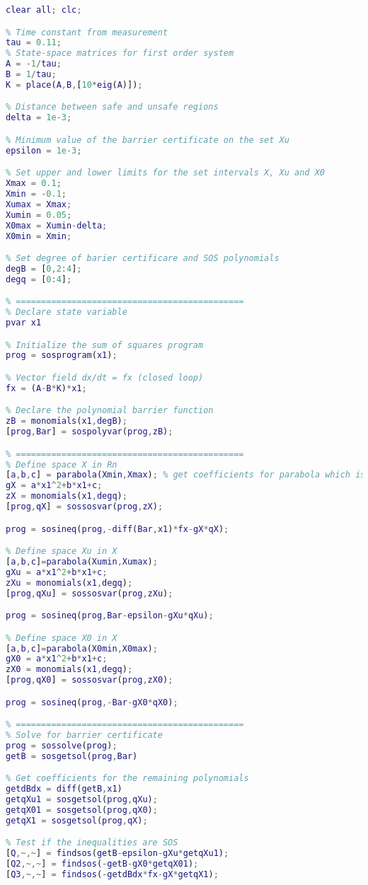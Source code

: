 \begin{lstlisting}[language=matlab]
% 1D system WITHOUT REFERENCE
clear all; clc; 

% Time constant from measurement
tau = 0.11;
% State-space matrices for first order system
A = -1/tau;
B = 1/tau;
K = place(A,B,[10*eig(A)]);

% Distance between safe and unsafe regions
delta = 1e-3;

% Minimum value of the barrier certificate on the set Xu
epsilon = 1e-3;

% Set upper and lower limits for the set intervals X, Xu and X0
Xmax = 0.1;
Xmin = -0.1;
Xumax = Xmax;
Xumin = 0.05;
X0max = Xumin-delta;
X0min = Xmin;

% Set degree of barier certificare and SOS polynomials
degB = [0,2:4];
degq = [0:4];

% =============================================
% Declare state variable
pvar x1 

% Initialize the sum of squares program
prog = sosprogram(x1);

% Vector field dx/dt = fx (closed loop)
fx = (A-B*K)*x1;

% Declare the polynomial barrier function
zB = monomials(x1,degB);
[prog,Bar] = sospolyvar(prog,zB);

% =============================================
% Define space X in Rn
[a,b,c] = parabola(Xmin,Xmax); % get coefficients for parabola which is positive for x in [-0.1,0.1]
gX = a*x1^2+b*x1+c;
zX = monomials(x1,degq);
[prog,qX] = sossosvar(prog,zX);

prog = sosineq(prog,-diff(Bar,x1)*fx-gX*qX);

% Define space Xu in X
[a,b,c]=parabola(Xumin,Xumax);
gXu = a*x1^2+b*x1+c;
zXu = monomials(x1,degq);
[prog,qXu] = sossosvar(prog,zXu);

prog = sosineq(prog,Bar-epsilon-gXu*qXu);

% Define space X0 in X
[a,b,c]=parabola(X0min,X0max);
gX0 = a*x1^2+b*x1+c;
zX0 = monomials(x1,degq);
[prog,qX0] = sossosvar(prog,zX0);

prog = sosineq(prog,-Bar-gX0*qX0);

% =============================================
% Solve for barrier certificate
prog = sossolve(prog);
getB = sosgetsol(prog,Bar)

% Get coefficients for the remaining polynomials
getdBdx = diff(getB,x1)
getqXu1 = sosgetsol(prog,qXu);
getqX01 = sosgetsol(prog,qX0);
getqX1 = sosgetsol(prog,qX);

% Test if the inequalities are SOS
[Q,~,~] = findsos(getB-epsilon-gXu*getqXu1);
[Q2,~,~] = findsos(-getB-gX0*getqX01);
[Q3,~,~] = findsos(-getdBdx*fx-gX*getqX1);
\end{lstlisting}

